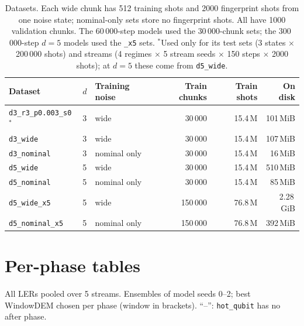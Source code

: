 \documentclass[11pt,a4paper]{article}
\newcommand{\code}[1]{\texttt{#1}}
\newcommand{\reg}[1]{\texttt{#1}}
\begin{document}
\begin{table}[htbp]
\centering
\small
\begin{tabular}{@{}lllrrr@{}}
\toprule
Dataset & $d$ & Training noise & Train chunks & Train shots & On disk \\
\midrule
\code{d3\_r3\_p0.003\_s0}$^{*}$ & 3 & wide & 30\,000 & 15.4\,M & 101\,MiB \\
\code{d3\_wide} & 3 & wide & 30\,000 & 15.4\,M & 107\,MiB \\
\code{d3\_nominal} & 3 & nominal only & 30\,000 & 15.4\,M & 16\,MiB \\
\code{d5\_wide} & 5 & wide & 30\,000 & 15.4\,M & 510\,MiB \\
\code{d5\_nominal} & 5 & nominal only & 30\,000 & 15.4\,M & 85\,MiB \\
\code{d5\_wide\_x5} & 5 & wide & 150\,000 & 76.8\,M & 2.28\,GiB \\
\code{d5\_nominal\_x5} & 5 & nominal only & 150\,000 & 76.8\,M & 392\,MiB \\
\bottomrule
\end{tabular}
\caption{Datasets. Each wide chunk has 512 training shots and 2000 fingerprint shots from one noise state;
nominal-only sets store no fingerprint shots. All have 1000 validation chunks. The 60\,000-step models used the
$30\,000$-chunk sets; the 300\,000-step $d=5$ models used the \code{\_x5} sets. $^{*}$Used only for its test sets
(3 states $\times$ 200\,000 shots) and streams (4 regimes $\times$ 5 stream seeds $\times$ 150 steps $\times$ 2000
shots); at $d=5$ these come from \code{d5\_wide}.}
\label{tab:datasets}
\end{table}

\section{Per-phase tables}\label{app:tables}

All LERs pooled over 5 streams. Ensembles of model seeds 0--2; best WindowDEM chosen per phase (window in brackets).
``--'': \reg{hot\_qubit} has no after phase.
\end{document}
